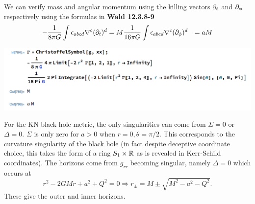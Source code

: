 \documentclass[11pt, class=article, crop=false]{standalone}
\begin{document}
\begin{enumerate}
	We can verify mass and angular momentum using the killing vectors $\partial_t$ and $\partial_\phi$ respectively using the formulas in \textbf{Wald 12.3.8-9}
	\[
	\begin{aligned}
		- \frac{1}{8\pi G} \int \epsilon_{abcd} \nabla^c (\partial_t)^d &= M
		\frac{1}{16\pi G} \int \epsilon_{abcd} \nabla^c (\partial_\phi)^d &= a M
	\end{aligned}
	\]
	\begin{center}
		\includegraphics[scale=0.5]{"Figures/verify M J"}
	\end{center}
	
	For the KN black hole metric, the only singularities can come from $\Sigma = 0$ or $\Delta = 0$. $\Sigma$ is only zero for $a > 0$ when $r= 0, \theta = \pi/2$. This corresponds to the curvature singularity of the black hole (in fact despite deceptive coordinate choice, this takes the form of a ring $S_1 \times \mathbb{R}$ as is revealed in Kerr-Schild coordinates). The horizons come from $g_{rr}$ becoming singular, namely $\Delta = 0$ which occurs at
	\[
		r^2 - 2 G M r + a^2 + Q^2 = 0 \Rightarrow r_\pm = M \pm \sqrt{M^2 - a^2 - Q^2}.
	\]
	These give the outer and inner horizons. 
	

\end{enumerate}
\end{document}
